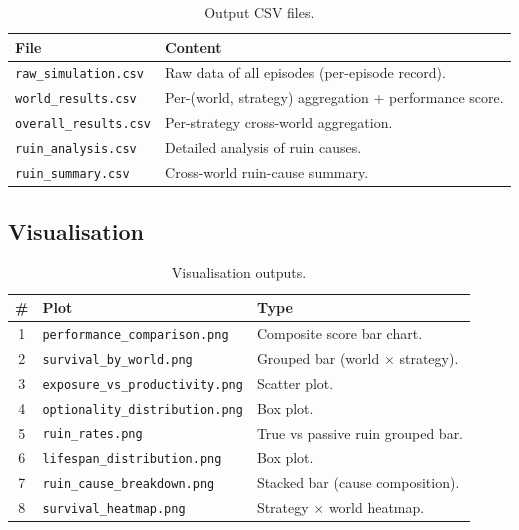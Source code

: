 \begin{table}[ht]
\centering
\small
\begin{tabularx}{\linewidth}{lX}
\toprule
\textbf{File} & \textbf{Content} \\
\midrule
\texttt{raw\_simulation.csv}
& Raw data of all episodes (per-episode record). \\
\texttt{world\_results.csv}
& Per-(world, strategy) aggregation + performance score. \\
\texttt{overall\_results.csv}
& Per-strategy cross-world aggregation. \\
\texttt{ruin\_analysis.csv}
& Detailed analysis of ruin causes. \\
\texttt{ruin\_summary.csv}
& Cross-world ruin-cause summary. \\
\bottomrule
\end{tabularx}
\caption[Output CSV files]{Output CSV files.}
\label{tab:vnext-csv-outputs}
\end{table}

\subsection{Visualisation}

\begin{table}[ht]
\centering
\small
\begin{tabularx}{\linewidth}{cXX}
\toprule
\textbf{\#} & \textbf{Plot} & \textbf{Type} \\
\midrule
1 & \texttt{performance\_comparison.png} & Composite score bar
chart. \\
2 & \texttt{survival\_by\_world.png} & Grouped bar (world $\times$
strategy). \\
3 & \texttt{exposure\_vs\_productivity.png} & Scatter plot. \\
4 & \texttt{optionality\_distribution.png} & Box plot. \\
5 & \texttt{ruin\_rates.png} & True vs passive ruin grouped bar. \\
6 & \texttt{lifespan\_distribution.png} & Box plot. \\
7 & \texttt{ruin\_cause\_breakdown.png} & Stacked bar (cause
composition). \\
8 & \texttt{survival\_heatmap.png} & Strategy $\times$ world
heatmap. \\
\bottomrule
\end{tabularx}
\caption[Visualisation outputs]{Visualisation outputs.}
\label{tab:vnext-plots}
\end{table}

